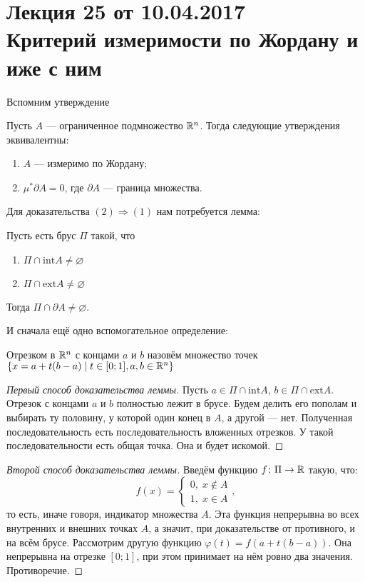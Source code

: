 \pagestyle{fancy}
\section{Лекция 25 от 10.04.2017 \\ Критерий измеримости по Жордану и иже с ним}

Вспомним утверждение
\begin{Statement}
Пусть $A$ --- ограниченное подмножество $\mathbb{R}^n$. Тогда следующие утверждения эквивалентны:
\begin{enumerate}
    \item $A$ --- измеримо по Жордану;
    \item $\mu^* \partial
 A = 0$, где $\partial
 A$ --- граница множества.
\end{enumerate}
\end{Statement}
Для доказательства $(2) \Rightarrow (1)$ нам потребуется лемма:
\begin{Lemma}
Пусть есть брус $\Pi$ такой, что
\begin{enumerate}
    \item $\Pi \cap \mathrm{int} A \neq \varnothing$
    \item $\Pi \cap \mathrm{ext} A \neq \varnothing$
\end{enumerate}
Тогда $\Pi \cap \partial
 A \neq \varnothing$.
\end{Lemma}
И сначала ещё одно вспомогательное определение:
\begin{Def}
Отрезком в $\mathbb{R}^n$ с концами $a$ и $b$ назовём множество точек $\{x = a + t(b-a)\;|\; t\in[0;1], a,b \in \mathbb{R}^n\}$
\end{Def}
\begin{proof} [Первый способ доказательства леммы]
    Пусть $a \in \Pi\cap \mathrm{int}A$, $b \in \Pi \cap \mathrm{ext}A$. Отрезок с концами $a$ и $b$ полностью лежит в брусе. Будем делить его пополам и выбирать ту половину, у которой один конец в $A$, а другой --- нет. Полученная последовательность есть последовательность вложенных отрезков. У такой последовательности есть общая точка. Она и будет искомой.
\end{proof}
\begin{proof}[Второй способ доказательства леммы]
Введём функцию $f\colon \Pi \to \mathbb{R}$ такую, что:
$$
    f(x) = \begin{cases}
        0,\; x\notin A\\
        1,\; x \in A
    \end{cases},
$$
то есть, иначе говоря, индикатор множества $A$. Эта функция непрерывна во всех внутренних и внешних точках $A$, а значит, при доказательстве от противного, и на всём брусе. Рассмотрим другую функцию $\varphi(t) = f(a + t(b-a))$. Она непрерывна на отрезке $[0;1]$, при этом принимает на нём ровно два значения. Противоречие.
\end{proof}
